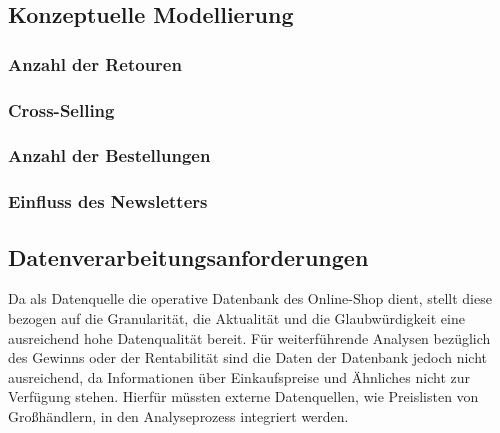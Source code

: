 \pagebreak

\subsection{Konzeptuelle Modellierung}
\subsubsection*{Anzahl der Retouren}

\begin{figure}[htbp] 
  \centering
     
\end{figure}

\vspace{11cm}

\subsubsection*{Cross-Selling}
\begin{figure}[htbp] 
  \centering
     
\end{figure}

\pagebreak

\subsubsection*{Anzahl der Bestellungen}
\begin{figure}[htbp] 
  \centering
     
\end{figure}

\vspace{11.6cm}

\subsubsection*{Einfluss des Newsletters}
\begin{figure}[htbp] 
  \centering
     
\end{figure}
\pagebreak

\subsection{Datenverarbeitungsanforderungen}
Da als Datenquelle die operative Datenbank des Online-Shop dient, stellt diese bezogen auf die Granularität, die Aktualität und die Glaubwürdigkeit eine ausreichend hohe Datenqualität bereit.   
Für weiterführende Analysen bezüglich des Gewinns oder der Rentabilität sind die Daten der Datenbank jedoch nicht ausreichend, da Informationen über Einkaufspreise und Ähnliches nicht zur Verfügung stehen. Hierfür müssten externe Datenquellen, wie Preislisten von Großhändlern, in den Analyseprozess integriert werden.

